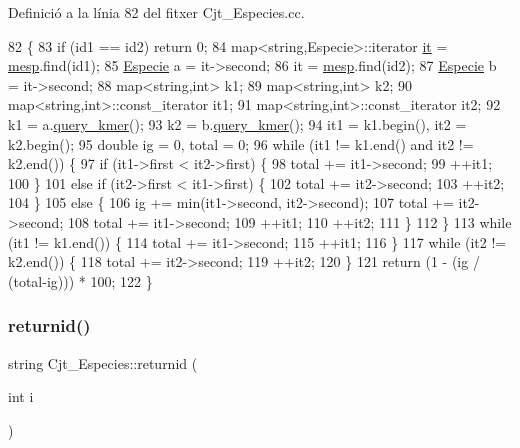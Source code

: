 Definició a la línia 82 del fitxer Cjt\+\_\+\+Especies.\+cc.


\begin{DoxyCode}
82                                                            \{
83     \textcolor{keywordflow}{if} (id1 == id2) \textcolor{keywordflow}{return} 0;
84     map<string,Especie>::iterator \hyperlink{class_cjt___especies_a25b19415a21bdabe9e2fc2ad7d2f68a5}{it} = \hyperlink{class_cjt___especies_a64a525b38c78935e7432b362ea9a2306}{mesp}.find(id1);
85     \hyperlink{class_especie}{Especie} a = it->second;
86     it = \hyperlink{class_cjt___especies_a64a525b38c78935e7432b362ea9a2306}{mesp}.find(id2);
87     \hyperlink{class_especie}{Especie} b = it->second;
88     map<string,int> k1;
89     map<string,int> k2;
90     map<string,int>::const\_iterator it1;
91     map<string,int>::const\_iterator it2;
92     k1 = a.\hyperlink{class_especie_ab446000c51668cabe39fb2b72ed5fff0}{query\_kmer}();
93     k2 = b.\hyperlink{class_especie_ab446000c51668cabe39fb2b72ed5fff0}{query\_kmer}();
94     it1 = k1.begin(), it2 = k2.begin();
95     \textcolor{keywordtype}{double} ig = 0, total = 0;
96     \textcolor{keywordflow}{while} (it1 != k1.end() and it2 != k2.end()) \{
97         \textcolor{keywordflow}{if} (it1->first < it2->first) \{
98             total += it1->second;
99             ++it1;
100         \}
101         \textcolor{keywordflow}{else} \textcolor{keywordflow}{if} (it2->first < it1->first) \{
102             total += it2->second;
103             ++it2;
104         \}
105         \textcolor{keywordflow}{else} \{
106             ig += min(it1->second, it2->second);
107             total += it2->second;
108             total += it1->second;
109             ++it1;
110             ++it2;
111         \}
112     \}
113     \textcolor{keywordflow}{while} (it1 != k1.end()) \{
114         total += it1->second;
115         ++it1;
116     \}
117     \textcolor{keywordflow}{while} (it2 != k2.end()) \{
118         total += it2->second;
119         ++it2; 
120     \}
121     \textcolor{keywordflow}{return} (1 - (ig / (total-ig))) * 100;
122 \}
\end{DoxyCode}
\mbox{\label{class_cjt___especies_af33bf6763e518251a77642136064bdbf}} 
\subsubsection{\texorpdfstring{returnid()}{returnid()}}
{\footnotesize\ttfamily string Cjt\+\_\+\+Especies\+::returnid (\begin{DoxyParamCaption}\item[{int}]{i }\end{DoxyParamCaption})}



